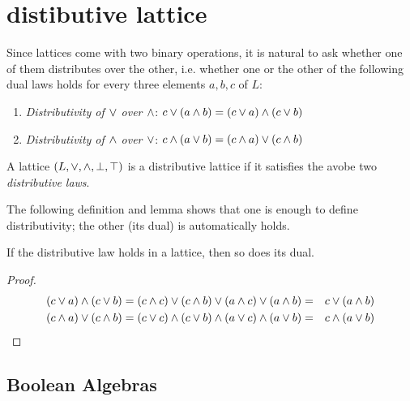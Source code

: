 \documentclass[dvipdfmx,autodetect-engine]{jsarticle}
\begin{document}
\def\fCenter{\leq}

\section{distibutive lattice}
%
%
Since lattices come with two binary operations, 
it is natural to ask whether one of them distributes over the other, 
i.e. whether one or the other of the following dual laws holds 
for every three elements $a, b, c$ of $L$:

\begin{enumerate}
\item {\em Distributivity of $\vee$ over $\wedge$}:
$ c \vee (a \wedge  b) = (c \vee a) \wedge   (c \vee b)$
\item {\em Distributivity of $\wedge$   over $\vee$}:
$c \wedge  (a\vee b) = (c\wedge  a) \vee  (c\wedge  b)$
\end{enumerate}

\begin{definition}\label{distributiveLattice}
A lattice $(L,\vee,\wedge,\bot,\top)$ is a distributive lattice 
if it satisfies the avobe two {\em distributive laws}.
\end{definition}

The following definition and lemma shows that one is enough 
to define distributivity; the other (its dual) is automatically holds. 

\begin{lemma}
If the distributive law holds in a lattice,  then so does its dual.
\end{lemma}
\begin{proof}
\begin{eqnarray*}
   (c \vee a) \wedge (c \vee b)
= (c \wedge c) \vee (c \wedge b) \vee  (a \wedge c) \vee (a \wedge b) 
&=&  c \vee (a \wedge b)  \\
   (c \wedge a) \vee (c \wedge b)
=  (c \vee c) \wedge (c \vee b) \wedge  (a \vee c) \wedge (a \vee b) 
&=&  c \wedge (a \vee b)
\end{eqnarray*}
\end{proof}

\subsection{Boolean Algebras} 
\end{document}
